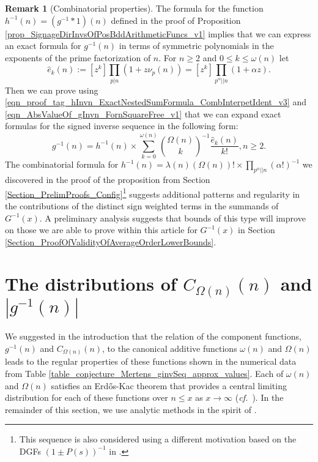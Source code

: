 \documentclass[11pt,reqno,a4letter]{article}
\numberwithin{figure}{section}
\numberwithin{table}{section}
\newcommand{\cf}{\textit{cf.\ }}
\theoremstyle{plain}
\numberwithin{theorem}{section}
\theoremstyle{definition}
\newtheorem{remark}[theorem]{Remark}
\begin{document}
\begin{remark}[Combinatorial properties]
The formula for the function $h^{-1}(n) = (g^{-1} \ast 1)(n)$ defined in the proof of 
Proposition \ref{prop_SignageDirInvsOfPosBddArithmeticFuncs_v1} implies that we can express 
an exact formula for $g^{-1}(n)$ in terms of symmetric polynomials in the 
exponents of the prime factorization of $n$. 
For $n \geq 2$ and $0 \leq k \leq \omega(n)$ let 
\[
\widehat{e}_k(n) := [z^k] \prod_{p|n} (1 + z \nu_p(n)) = [z^k] \prod_{p^{\alpha} || n} (1 + \alpha z). 
\]
Then we can prove using 
\eqref{eqn_proof_tag_hInvn_ExactNestedSumFormula_CombInterpetIdent_v3} and 
\eqref{eqn_AbsValueOf_gInvn_FornSquareFree_v1} that we can expand exact formulas for 
the signed inverse sequence in the following form: 
\[
g^{-1}(n) = h^{-1}(n) \times \sum_{k=0}^{\omega(n)} \binom{\Omega(n)}{k}^{-1} 
     \frac{\widehat{e}_k(n)}{k!}, n \geq 2. 
\]
The combinatorial formula for 
$h^{-1}(n) = \lambda(n) (\Omega(n))! \times \prod_{p^{\alpha} || n} (\alpha !)^{-1}$ 
we discovered in the proof of the proposition from 
Section \ref{Section_PrelimProofs_Config}\footnote{ 
     This sequence is also considered using a different motivation based on the DGFs 
     $(1\pm P(s))^{-1}$ in \cite[\S 2]{FROBERG-1968}. 
}  
suggests additional patterns and regularity in the contributions of the distinct sign weighted 
terms in the summands of $G^{-1}(x)$. 
A preliminary analysis suggests that bounds of this type 
will improve on those we are able to prove within this article for $G^{-1}(x)$ in 
Section \ref{Section_ProofOfValidityOfAverageOrderLowerBounds}. 
\end{remark}

\newpage
\section{The distributions of $C_{\Omega(n)}(n)$ and $|g^{-1}(n)|$} 
\label{Section_NewFormulasForgInvn} 

We suggested in the introduction that the relation of the component 
functions, $g^{-1}(n)$ and $C_{\Omega(n)}(n)$, to the canonical additive functions 
$\omega(n)$ and $\Omega(n)$ leads to the regular properties of these functions 
shown in the numerical data from 
Table \ref{table_conjecture_Mertens_ginvSeq_approx_values}. 
Each of $\omega(n)$ and $\Omega(n)$ satisfies 
an Erd\H{o}s-Kac theorem that provides a central limiting 
distribution for each of these functions over 
$n \leq x$ as $x \rightarrow \infty$ 
\cite{ERDOS-KAC-REF,BILLINGSLY-CLT-PRIMEDIVFUNC,RENYI-TURAN} 
(\cf \cite{CLT-RANDOM-ORDERED-FACTS-2011}). 
In the remainder of this section, we use analytic methods in the spirit of 
\cite[\S 7.4]{MV}. 
\end{document}
